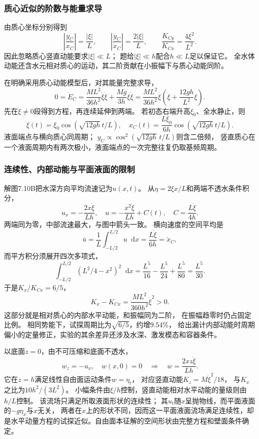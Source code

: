 \documentclass[UTF8,fontset=fandol,a4paper,11pt]{ctexart}
\newcommand{\dd}{\mathop{}\!\mathrm{d}}
\begin{document}
\subsubsection*{质心近似的阶数与能量求导}
由质心坐标分别得到
\[
\left|\frac{y_C}{x_C}\right|=\frac{|\xi|}{L},\qquad
\left|\frac{\dot y_C}{\dot x_C}\right|=\frac{2|\xi|}{L},\qquad
\frac{K_{Cy}}{K_{Cx}}=\frac{4\xi^2}{L^2}.
\]
因此忽略质心竖直动能要求$|\xi|\ll L$；
题给$|\xi|\ll h$配合$h\ll L$足以保证它。
全水体动能还含水元相对质心的运动，其二阶贡献在小振幅下与质心动能同阶。

在明确采用质心动能模型后，对其能量完整求导，
\[
0=\dot E_C=\frac{ML^2}{36h^2}\dot\xi\ddot\xi
+\frac{Mg}{3h}\xi\dot\xi
=\frac{ML^2}{36h^2}\dot\xi
\left(\ddot\xi+\frac{12gh}{L^2}\xi\right).
\]
先在$\dot\xi\ne0$段得到方程，再连续延伸到两端。
若初态右端升高$\xi_0$、全水静止，则
\[
\xi(t)=\xi_0\cos(\sqrt{12gh}\,t/L),\quad
x_C(t)=\frac{L\xi_0}{6h}\cos(\sqrt{12gh}\,t/L).
\]
液面端点与横向质心同周期；
$y_C\propto\cos^2(\sqrt{12gh}\,t/L)$则含二倍频，
竖直质心在一个液面周期内有两次极小，液面端点的一次完整往复仍取基频周期。

\subsubsection*{连续性、内部动能与平面液面的限制}
解图7.10B把水深方向平均流速记为$u(x,t)$。
从$\eta=2\xi x/L$和两端不透水条件积分，
\[
u_x=-\frac{2x\dot\xi}{Lh},\quad
u=-\frac{x^2\dot\xi}{Lh}+C(t),\quad
C=\frac{L\dot\xi}{4h}.
\]
两端同为零，中部流速最大，与图中箭头一致。
横向速度的空间平均是
\[
\bar u=\frac1L\int_{-L/2}^{L/2}u\dd x
=\frac{L\dot\xi}{6h}=\dot x_C,
\]
而平方积分须展开四次多项式，
\[
\int_{-L/2}^{L/2}(L^2/4-x^2)^2\dd x
=\frac{L^5}{16}-\frac{L^5}{24}+\frac{L^5}{80}
=\frac{L^5}{30}.
\]
于是$K_x/K_{Cx}=6/5$，
\[
K_x-K_{Cx}=\frac{ML^2}{360h^2}\dot\xi^2>0.
\]
这部分就是相对质心的内部水平动能，和振幅同为二阶，
在振幅趋零时仍占固定比例。
相同势能下，试探周期比为$\sqrt{6/5}$，约增$9.54\%$，
给出漏计内部动能时周期偏小的定量修正，实验的其余差异还涉及水深、激发模态和容器条件。

以底面$z=0$，由不可压缩和底面不透水，
\[
w_z=-u_x,\quad w(x,0)=0
\quad\Longrightarrow\quad w=\frac{2xz\dot\xi}{Lh}.
\]
它在$z=h$满足线性自由面运动条件$w=\eta_t$，
对应竖直动能$K_z=M\dot\xi^2/18$，
与$K_x$之比为$10h^2/(3L^2)$。
小幅条件由$\xi/h$控制，竖直动能相对水平动能的量级则由$h/L$控制。
该流场只满足所取液面形状的连续性；
其$u_t$随$x$呈抛物线，而平面液面的$-g\eta_x$与$x$无关，
两者在$x$上的形状不同，因而这一平面液面流场满足连续性，却是水平动量方程的试探近似。自由面本征解的空间形状由完整方程和壁面条件确定。
\end{document}
